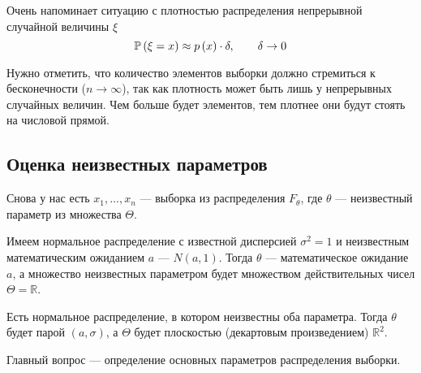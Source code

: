 Очень напоминает ситуацию с плотностью распределения
непрерывной случайной величины $\xi$
$$\mathbb{P}\left( \xi=x \right)\approx p\left(x\right)\cdot\delta,\qquad\delta\to 0$$

Нужно отметить, что количество элементов выборки
должно стремиться к бесконечности ($n\to\infty$),
так как плотность может быть лишь у непрерывных случайных величин.
Чем больше будет элементов,
тем плотнее они будут стоять на числовой прямой.

\subsection{Оценка неизвестных параметров}
Снова у нас есть $x_1, \dots, x_n$ --- выборка из распределения $F_\theta$,
где $\theta$ --- неизвестный параметр из множества $\Theta$.

\begin{example}
    Имеем нормальное распределение с известной дисперсией $\sigma^2 = 1$
    и неизвестным математическим ожиданием $a$ --- $N\left(a,1\right)$.
    Тогда $\theta$ --- математическое ожидание $a$, а множество неизвестных
    параметром будет множеством действительных чисел $\Theta = \mathbb{R}$.
\end{example}
\begin{example}
    Есть нормальное распределение, в котором неизвестны оба параметра.
    Тогда $\theta$ будет парой $(a,\sigma)$, а $\Theta$ будет плоскостью
    (декартовым произведением) $\mathbb{R}^2$.
\end{example}

Главный вопрос --- определение основных параметров распределения выборки.

